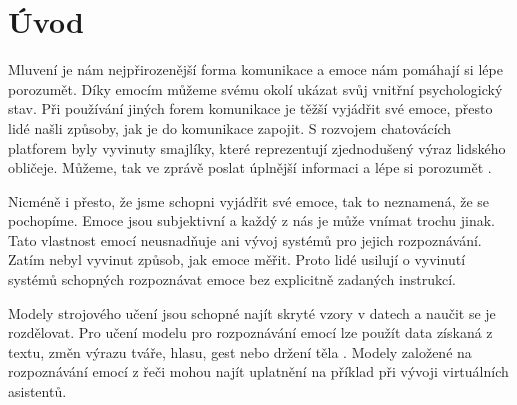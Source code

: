 \documentclass[FM,BP]{tulthesis}
\begin{document}

\begin{abstractCZ}
\end{abstractCZ}

\begin{keywordsCZ}
\end{keywordsCZ}

\vspace{2cm}

\begin{abstractEN}
\end{abstractEN}

\begin{keywordsEN}
\end{keywordsEN}

\clearpage

\begin{acknowledgement}
\end{acknowledgement}

\tableofcontents

\clearpage

\begin{abbrList}
\end{abbrList}

\chapter{Úvod}
Mluvení je nám nejpřirozenější forma komunikace a emoce nám pomáhají si lépe porozumět. Díky emocím můžeme svému okolí ukázat svůj vnitřní psychologický stav. Při používání jiných forem komunikace je těžší vyjádřit své emoce, přesto lidé našli způsoby, jak je do komunikace zapojit. S rozvojem chatovácích platforem byly vyvinuty smajlíky, které reprezentují zjednodušený výraz lidského obličeje. Můžeme, tak ve zprávě poslat úplnější informaci a lépe si porozumět \cite{DBLP:journals/speech/AkcayO20}.

Nicméně i přesto, že jsme schopni vyjádřit své emoce, tak to neznamená, že se pochopíme. Emoce jsou subjektivní a každý z nás je může vnímat trochu jinak. Tato vlastnost emocí neusnadňuje ani vývoj systémů pro jejich rozpoznávání. Zatím nebyl vyvinut způsob, jak emoce měřit. Proto lidé usilují o vyvinutí systémů schopných rozpoznávat emoce bez explicitně zadaných instrukcí.

Modely strojového učení jsou schopné najít skryté vzory v datech a naučit se je rozdělovat. Pro učení modelu pro rozpoznávání emocí lze použít data získaná z textu, změn výrazu tváře, hlasu, gest nebo držení těla \cite{konar_chakraborty_2015}. Modely založené na rozpoznávání emocí z řeči mohou najít uplatnění na příklad při vývoji virtuálních asistentů. 
\end{document}
